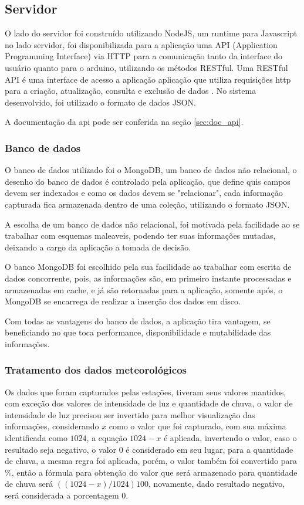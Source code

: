 \subsection{Servidor}
\label{sec:servidor}

O lado do servidor foi construído utilizando NodeJS, um runtime para Javascript no lado servidor, foi disponibilizada para a aplicação uma API (Application Programming Interface) via HTTP para a comunicação tanto da interface do usuário quanto para o arduino, utilizando os métodos RESTful.
Uma RESTful API é uma interface de acesso a aplicação aplicação que utiliza requisições http para a criação, atualização, consulta e exclusão de dados \cite{restful_api}. No sistema desenvolvido, foi utilizado o formato de dados JSON.

A documentação da api pode ser conferida na seção \ref{sec:doc_api}.

\subsubsection{Banco de dados}

O banco de dados utilizado foi o MongoDB, um banco de dados não relacional, o desenho do banco de dados é controlado pela aplicação, que define quis campos devem ser indexados e como os dados devem se "relacionar", cada informação capturada fica armazenada dentro de uma coleção, utilizando o formato JSON.

A escolha de um banco de dados não relacional, foi motivada pela facilidade ao se trabalhar com esquemas maleaveis, podendo ter suas informações mutadas, deixando a cargo da aplicação a tomada de decisão.

O banco MongoDB foi escolhido pela sua facilidade ao trabalhar com escrita de dados concorrente, pois, as informações são, em primeiro instante processadas e armazenadas em cache, e já são retornadas para a aplicação, somente após, o MongoDB se encarrega de realizar a inserção dos dados em disco.

Com todas as vantagens do banco de dados, a aplicação tira vantagem, se beneficiando no que toca performance, disponibilidade e mutabilidade das informações.

\subsubsection{Tratamento dos dados meteorológicos}
\label{sec:tratamento_dados}

Os dados que foram capturados pelas estações, tiveram seus valores mantidos, com exceção dos valores de intensidade de luz e quantidade de chuva, o valor de intensidade de luz precisou ser invertido para melhor visualização das informações, considerando $x$ como o valor que foi capturado, com sua máxima identificada como $1024$, a equação $1024 - x$ é aplicada, invertendo o valor, caso o resultado seja negativo, o valor $0$ é considerado em seu lugar, para a quantidade de chuva, a mesma regra foi aplicada, porém, o valor também foi convertido para \%, então a fórmula para obtenção do valor que será armazenado para quantidade de chuva será $((1024-x)/1024)100$, novamente, dado resultado negativo, será considerada a porcentagem $0$.

